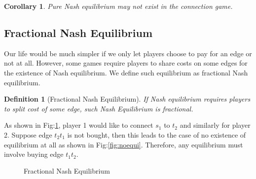 \documentclass[11pt,psfig,times]{article}
\newtheorem{corollary}{Corollary}[section]
\newtheorem{definition}{Definition}[section]
\begin{document}
\begin{corollary}
Pure Nash equilibrium may not exist in the connection game.
\end{corollary}

    
\subsection{Fractional Nash Equilibrium}
Our life would be much simpler if we only let players choose to pay for an edge or not at all. However, some games require players to share costs on some edges for the existence of Nash equilibrium. We define such equilibrium as fractional Nash equilibrium.

\begin{definition}[Fractional Nash Equilibrium]If Nash equilibrium requires players to split cost of some edge, such Nash Equilibrium is fractional.	
\end{definition}

As shown in Fig:\ref{fig:fracquil}, player 1 would like to connect $s_1$ to $t_2$ and similarly for player 2. Suppose edge $t_2t_1$ is not bought, then this leads to the case of no existence of equilibrium at all as shown in Fig:\ref{fig:noequi}. Therefore, any equilibrium must involve buying edge $t_1t_2$. 
\begin{figure}[H]
\begin{center}
\end{center}
\caption{Fractional Nash Equilibrium}
\label{fig:fracquil}
\end{figure}
\end{document}
